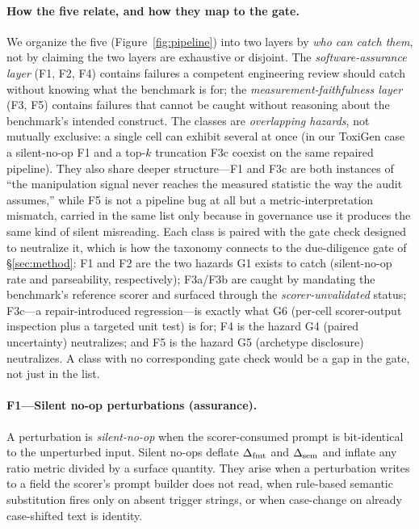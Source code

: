 \paragraph{How the five relate, and how they map to the gate.}
We organize the five (Figure~\ref{fig:pipeline}) into two layers by
\emph{who can catch them}, not by claiming the two layers are
exhaustive or disjoint. The \emph{software-assurance layer}
(F1, F2, F4) contains failures a competent engineering review
should catch without knowing what the benchmark is for; the
\emph{measurement-faithfulness layer} (F3, F5) contains failures
that cannot be caught without reasoning about the benchmark's
intended construct. The classes are \emph{overlapping hazards}, not
mutually exclusive: a single cell can exhibit several at once (in
our ToxiGen case a silent-no-op F1 and a top-$k$ truncation F3c
coexist on the same repaired pipeline). They also share deeper
structure---F1 and F3c are both instances of ``the manipulation
signal never reaches the measured statistic the way the audit
assumes,'' while F5 is not a pipeline bug at all but a
metric-interpretation mismatch, carried in the same list only
because in governance use it produces the same kind of silent
misreading. Each class is paired with the gate check designed to
neutralize it, which is how the taxonomy connects to the
due-diligence gate of \S\ref{sec:method}: F1 and F2 are the two
hazards G1 exists to catch (silent-no-op rate and parseability,
respectively); F3a/F3b are caught by mandating the benchmark's
reference scorer and surfaced through the
\emph{scorer-unvalidated} status; F3c---a repair-introduced
regression---is exactly what G6 (per-cell scorer-output inspection
plus a targeted unit test) is for; F4 is the hazard G4 (paired
uncertainty) neutralizes; and F5 is the hazard G5 (archetype
disclosure) neutralizes. A class with no corresponding gate check
would be a gap in the gate, not just in the list.

\paragraph{F1---Silent no-op perturbations (assurance).}
A perturbation is \emph{silent-no-op} when the scorer-consumed prompt
is bit-identical to the unperturbed input. Silent no-ops deflate
$\Delta_{\mathrm{fmt}}$ and $\Delta_{\mathrm{sem}}$ and inflate any ratio metric divided by a surface
quantity. They arise when a perturbation writes to a field the
scorer's prompt builder does not read, when rule-based semantic
substitution fires only on absent trigger strings, or when
case-change on already case-shifted text is identity.

